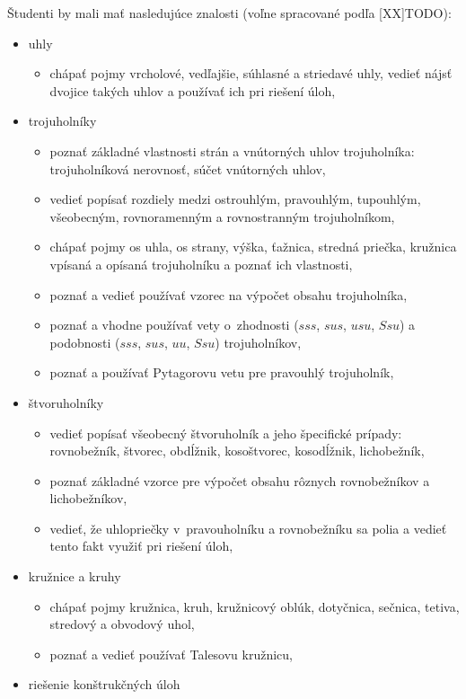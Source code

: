 {Študenti by mali mať nasledujúce znalosti (voľne spracované podľa [XX]TODO):
\begin{itemize}
\item uhly
\begin{itemize}
\item chápať pojmy vrcholové, vedľajšie, súhlasné a striedavé uhly, vedieť nájsť dvojice takých uhlov a používať ich pri riešení úloh,
\end{itemize}
\item trojuholníky
\begin{itemize}
\item poznať základné vlastnosti strán a vnútorných uhlov trojuholníka: trojuholníková nerovnosť, súčet vnútorných uhlov,
\item vedieť popísať rozdiely medzi ostrouhlým, pravouhlým, tupouhlým, všeobecným, rovnoramenným a rovnostranným trojuholníkom,
\item chápať pojmy os uhla, os strany, výška, ťažnica, stredná priečka, kružnica vpísaná a opísaná trojuholníku a poznať ich vlastnosti,
\item poznať a vedieť používať vzorec na výpočet obsahu trojuholníka,
\item poznať a vhodne používať vety o~zhodnosti ($sss$, $sus$, $usu$, $Ssu$) a podobnosti ($sss$, $sus$, $uu$, $Ssu$) trojuholníkov,
\item poznať a používať Pytagorovu vetu pre pravouhlý trojuholník,
\end{itemize}
\item štvoruholníky
\begin{itemize}
\item vedieť popísať všeobecný štvoruholník a jeho špecifické prípady: rovnobežník, štvorec, obdĺžnik, kosoštvorec, kosodĺžnik, lichobežník,
\item poznať základné vzorce pre výpočet obsahu rôznych rovnobežníkov a lichobežníkov,
\item vedieť, že uhlopriečky v~pravouholníku a rovnobežníku sa polia a vedieť tento fakt využiť pri riešení úloh,
\end{itemize}
\item kružnice a kruhy
\begin{itemize}
\item chápať pojmy kružnica, kruh, kružnicový oblúk, dotyčnica, sečnica, tetiva, stredový a obvodový uhol,
\item poznať a vedieť používať Talesovu kružnicu,
\end{itemize}
\item riešenie konštrukčných úloh

\end{itemize}}
